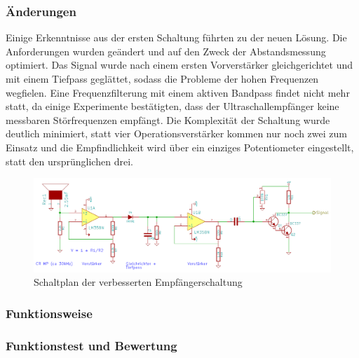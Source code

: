 \subsubsection{Änderungen}
Einige Erkenntnisse aus der ersten Schaltung führten zu der neuen Lösung. Die Anforderungen wurden geändert und auf den Zweck der Abstandsmessung optimiert. Das Signal wurde nach einem ersten Vorverstärker gleichgerichtet und mit einem Tiefpass geglättet, sodass die Probleme der hohen Frequenzen wegfielen. Eine Frequenzfilterung mit einem aktiven Bandpass findet nicht mehr statt, da einige Experimente bestätigten, dass der Ultraschallempfänger keine messbaren Störfrequenzen empfängt. Die Komplexität der Schaltung wurde deutlich minimiert, statt vier Operationsverstärker kommen nur noch zwei zum Einsatz und die Empfindlichkeit wird über ein einziges Potentiometer eingestellt, statt den ursprünglichen drei.

\begin{landscape}
	\begin{figure}
		\centering
		\includegraphics[width=(1.5\textwidth)]{images/empfanger2.png}
		\caption{Schaltplan der verbesserten Empfängerschaltung} \label{img:Empf2}
	\end{figure}
\end{landscape}

\subsubsection{Funktionsweise}



\subsubsection{Funktionstest und Bewertung}


